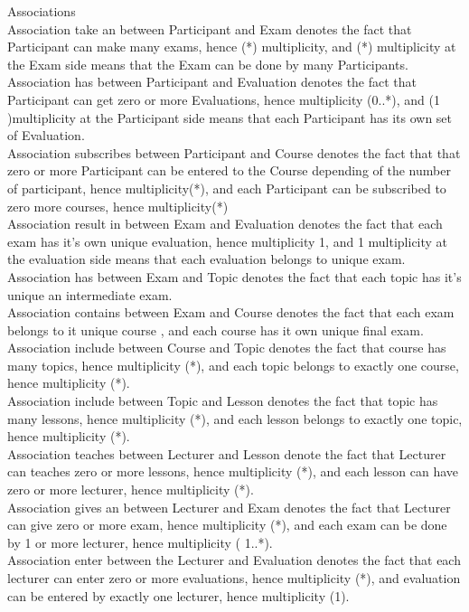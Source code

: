 \documentclass{scrartcl}
\begin{document}
Associations\\

Association take an between Participant and Exam denotes the fact that Participant can make many exams, hence (*) multiplicity, and (*) multiplicity at the Exam side means that the  Exam can be done by many Participants.\\
Association has between Participant and Evaluation denotes the fact that Participant can get zero or more Evaluations, hence multiplicity (0..*), and (1 )multiplicity at the Participant side means that each Participant has its own set of Evaluation.\\
Association subscribes between Participant and Course denotes the fact that that zero or more Participant can be entered to the Course depending of the number of participant, hence multiplicity(*), and each Participant can be subscribed to zero more courses, hence multiplicity(*)\\
Association result in between Exam and Evaluation denotes the fact that each exam has it’s own unique evaluation, hence multiplicity 1, and 1 multiplicity at the evaluation side means that each evaluation belongs to unique exam.\\
Association has between Exam and Topic denotes the fact that each topic has it’s unique an intermediate exam. \\
Association contains between Exam and Course denotes the fact that each exam belongs to it unique course , and each course has it own unique final exam. \\
Association include between Course and Topic denotes the fact that course has many topics, hence multiplicity (*), and each topic belongs to exactly one course, hence multiplicity (*). \\
Association include between Topic and Lesson denotes the fact that topic has many lessons, hence multiplicity (*), and each lesson belongs to exactly one topic, hence multiplicity (*). \\
Association teaches between Lecturer and Lesson denote the fact that Lecturer can teaches zero or more lessons, hence multiplicity (*), and each lesson can have zero or more lecturer, hence multiplicity (*). \\
Association gives an between Lecturer and Exam denotes the fact that Lecturer can give zero or more exam, hence multiplicity (*), and each exam can be done by 1 or more lecturer, hence multiplicity ( 1..*). \\
Association enter between the Lecturer and Evaluation denotes the fact that each lecturer can enter zero or more evaluations, hence multiplicity (*), and evaluation can be entered by exactly one lecturer, hence multiplicity (1). \\
\end{document}
